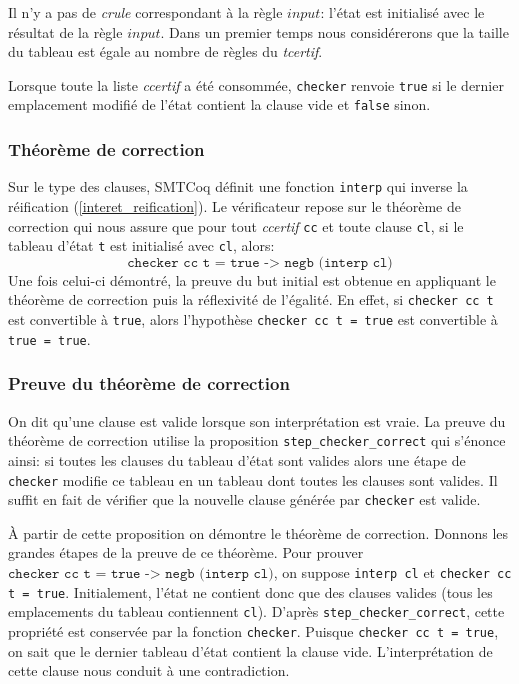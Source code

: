 \documentclass[11pt]{article}
\begin{document}
Il n'y a pas de \textit{crule} correspondant à la règle $input$: l'état est initialisé avec le résultat de la règle $input$. Dans un premier temps nous considérerons que la taille du tableau est égale au nombre de règles du \textit{tcertif}.\medbreak

Lorsque toute la liste \textit{ccertif} a été consommée, \texttt{checker} renvoie \texttt{true} si le dernier emplacement modifié de l'état contient la clause vide et \texttt{false} sinon.

\subsubsection{Théorème de correction}

Sur le type des clauses, SMTCoq définit une fonction \texttt{interp} qui inverse la réification (\ref{interet_reification}). Le vérificateur repose sur le théorème de correction qui nous assure que pour tout \textit{ccertif} \texttt{cc} et toute clause \texttt{cl}, si le tableau d'état \texttt{t} est initialisé avec \texttt{cl},  alors: 
\[ \texttt{checker cc t = true -> negb (interp cl)} \]
 Une fois celui-ci démontré, la preuve du but initial est obtenue en appliquant le théorème de correction puis la réflexivité de l'égalité. En effet, si \texttt{checker cc t} est convertible à \texttt{true}, alors l'hypothèse \texttt{checker cc t = true} est convertible à \texttt{true = true}.

\subsubsection{Preuve du théorème de correction} \label{preuve_correction}

On dit qu'une clause est valide lorsque son interprétation est vraie. La preuve du théorème de correction utilise la proposition \texttt{step\_checker\_correct} qui s'énonce ainsi: si toutes les clauses du tableau d'état sont valides alors une étape de \texttt{checker} modifie ce tableau en un tableau dont toutes les clauses sont valides. Il suffit en fait de vérifier que la nouvelle clause générée par \texttt{checker} est valide. \medbreak

À partir de cette proposition on démontre le théorème de correction. Donnons les grandes étapes de la preuve de ce théorème. Pour prouver $\texttt{checker cc t = true -> negb (interp cl)}$, on suppose \texttt{interp cl} et \texttt{checker cc t = true}. Initialement, l'état ne contient donc que des clauses valides (tous les emplacements du tableau contiennent \texttt{cl}). D'après \texttt{step\_checker\_correct}, cette propriété est conservée par la fonction \texttt{checker}. Puisque \texttt{checker cc t = true}, on sait que le dernier tableau d'état contient la clause vide. L'interprétation de cette clause nous conduit à une contradiction.
\end{document}
